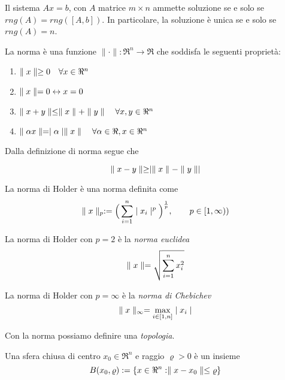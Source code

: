 \begin{theorem}
	\label{thm:existance-solution-linear-system}
	Il sistema $Ax=b$, con $A$ matrice $m\times n$ ammette soluzione se e solo se $rng(A)=rng([A,b])$.
	In particolare, la soluzione è unica se e solo se $rng(A)=n$.
\end{theorem}

\begin{definition}[Norma]
	\label{dfn:norm}
	La norma è una funzione $\parallel\cdot\parallel :\Re^{n}\rightarrow\Re$ che soddisfa le seguenti proprietà:
	\begin{enumerate}
		\item $\parallel x \parallel \geq 0 \quad \forall x\in\Re^{n}$
		\item $\parallel x \parallel=0 \leftrightarrow x=0$
		\item $\parallel x+y \parallel\leq\parallel x \parallel+\parallel y \parallel \quad \forall x,y \in\Re^{n}$
		\item $\parallel \alpha x \parallel=\mid \alpha \mid\parallel x \parallel \quad \forall \alpha\in\Re,x\in\Re^{n}$
	\end{enumerate}
\end{definition}

Dalla definizione di norma segue che

\begin{equation}
\parallel x-y \parallel\geq\mid \parallel x \parallel-\parallel y \parallel \mid
\end{equation}

\begin{definition}
	\label{dfn:norm-holder}
	La norma di Holder è una norma definita come
	\begin{equation}
		\label{eqn:norm-holder}
		\parallel x \parallel_{p}:=\Big(\sum_{i=1}^{n}\mid x_{i} \mid^{p}\Big)^{\frac{1}{p}}, \qquad p\in[1,\infty))
	\end{equation}
\end{definition}

La norma di Holder con $p=2$ è la \textit{norma euclidea}
\begin{equation}
\label{eqn:norm-euclide}
	\parallel x \parallel=\sqrt{\sum_{i=1}^{n}x_{i}^{2}}
\end{equation}

La norma di Holder con $p=\infty$ è la \textit{norma di Chebichev}
\begin{equation}
\label{eqn:norm-chebichev}
	\parallel x \parallel_{\infty}=\max_{i\in[1,n]}\mid x_{i} \mid
\end{equation}

Con la norma possiamo definire una \textit{topologia}.

\begin{definition}
	\label{dfn:sphere-closed}
	Una sfera chiusa di centro $x_{0}\in\Re^{n}$ e raggio $\varrho>0$ è un insieme
	\begin{equation}
	\label{eqn:sphere-closed}
	B(x_{0},\varrho):=\{x\in\Re^{n}:\parallel x-x_{0} \parallel\leq\varrho\}
	\end{equation}
\end{definition}

